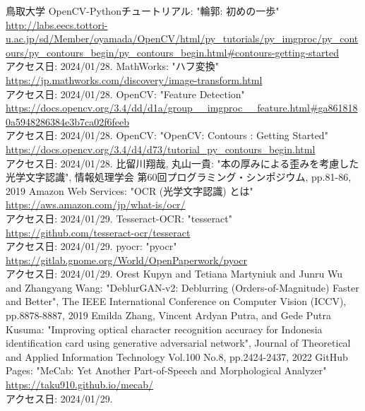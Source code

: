 \documentclass[uplatex, report, a4j, 10pt]{jsbook}
\begin{document}
\begin{thebibliography}{0}
  鳥取大学 OpenCV-Pythonチュートリアル: "輪郭: 初めの一歩"\\\url{http://labs.eecs.tottori-u.ac.jp/sd/Member/oyamada/OpenCV/html/py_tutorials/py_imgproc/py_contours/py_contours_begin/py_contours_begin.html#contours-getting-started}\\アクセス日: 2024/01/28.
  MathWorks: "ハフ変換"\\\url{https://jp.mathworks.com/discovery/image-transform.html}\\アクセス日: 2024/01/28.
  OpenCV: "Feature Detection"\\\url{https://docs.opencv.org/3.4/dd/d1a/group__imgproc__feature.html#ga8618180a5948286384e3b7ca02f6feeb}\\アクセス日: 2024/01/28.
  OpenCV: "OpenCV: Contours : Getting Started"\\\url{https://docs.opencv.org/3.4/d4/d73/tutorial_py_contours_begin.html}\\アクセス日: 2024/01/28.
  比留川翔哉, 丸山一貴: "本の厚みによる歪みを考慮した光学文字認識", 情報処理学会 第60回プログラミング・シンポジウム, pp.81-86, 2019
  Amazon Web Services: "OCR (光学文字認識) とは"\\\url{https://aws.amazon.com/jp/what-is/ocr/}\\アクセス日: 2024/01/29.
  Tesseract-OCR: "tesseract"\\\url{https://github.com/tesseract-ocr/tesseract}\\アクセス日: 2024/01/29.
  pyocr: "pyocr"\\\url{https://gitlab.gnome.org/World/OpenPaperwork/pyocr}\\アクセス日: 2024/01/29.
  Orest Kupyn and Tetiana Martyniuk and Junru Wu and Zhangyang Wang: "DeblurGAN-v2: Deblurring (Orders-of-Magnitude) Faster and Better", The IEEE International Conference on Computer Vision (ICCV), pp.8878-8887, 2019
  Emilda Zhang,  Vincent Ardyan Putra, and Gede Putra Kusuma: "Improving optical character recognition accuracy for Indonesia identification card using generative adversarial network", Journal of Theoretical and Applied Information Technology Vol.100 No.8, pp.2424-2437, 2022
  GitHub Pages: "MeCab: Yet Another Part-of-Speech and Morphological Analyzer"\\\url{https://taku910.github.io/mecab/}\\アクセス日: 2024/01/29.

\end{thebibliography}
\end{document}
